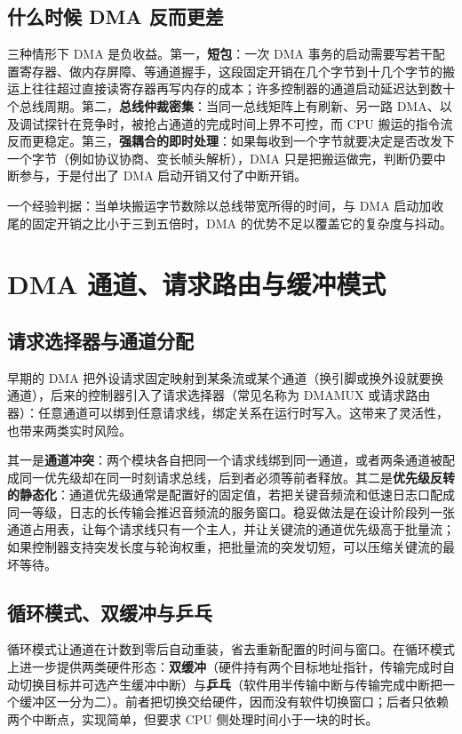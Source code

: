 \documentclass[12pt,a4paper,fontset=fandol]{ctexbook}
\begin{document}
\subsection{什么时候 DMA 反而更差}

三种情形下 DMA 是负收益。第一，\textbf{短包}：一次 DMA 事务的启动需要写若干配置寄存器、做内存屏障、等通道握手，这段固定开销在几个字节到十几个字节的搬运上往往超过直接读寄存器再写内存的成本；许多控制器的通道启动延迟达到数十个总线周期。第二，\textbf{总线仲裁密集}：当同一总线矩阵上有刷新、另一路 DMA、以及调试探针在竞争时，被抢占通道的完成时间上界不可控，而 CPU 搬运的指令流反而更稳定。第三，\textbf{强耦合的即时处理}：如果每收到一个字节就要决定是否改发下一个字节（例如协议协商、变长帧头解析），DMA 只是把搬运做完，判断仍要中断参与，于是付出了 DMA 启动开销又付了中断开销。

一个经验判据：当单块搬运字节数除以总线带宽所得的时间，与 DMA 启动加收尾的固定开销之比小于三到五倍时，DMA 的优势不足以覆盖它的复杂度与抖动。

\section{DMA 通道、请求路由与缓冲模式}

\subsection{请求选择器与通道分配}

早期的 DMA 把外设请求固定映射到某条流或某个通道（换引脚或换外设就要换通道），后来的控制器引入了请求选择器（常见名称为 DMAMUX 或请求路由器）：任意通道可以绑到任意请求线，绑定关系在运行时写入。这带来了灵活性，也带来两类实时风险。

其一是\textbf{通道冲突}：两个模块各自把同一个请求线绑到同一通道，或者两条通道被配成同一优先级却在同一时刻请求总线，后到者必须等前者释放。其二是\textbf{优先级反转的静态化}：通道优先级通常是配置好的固定值，若把关键音频流和低速日志口配成同一等级，日志的长传输会推迟音频流的服务窗口。稳妥做法是在设计阶段列一张通道占用表，让每个请求线只有一个主人，并让关键流的通道优先级高于批量流；如果控制器支持突发长度与轮询权重，把批量流的突发切短，可以压缩关键流的最坏等待。

\subsection{循环模式、双缓冲与乒乓}

循环模式让通道在计数到零后自动重装，省去重新配置的时间与窗口。在循环模式上进一步提供两类硬件形态：\textbf{双缓冲}（硬件持有两个目标地址指针，传输完成时自动切换目标并可选产生缓冲中断）与\textbf{乒乓}（软件用半传输中断与传输完成中断把一个缓冲区一分为二）。前者把切换交给硬件，因而没有软件切换窗口；后者只依赖两个中断点，实现简单，但要求 CPU 侧处理时间小于一块的时长。
\end{document}
